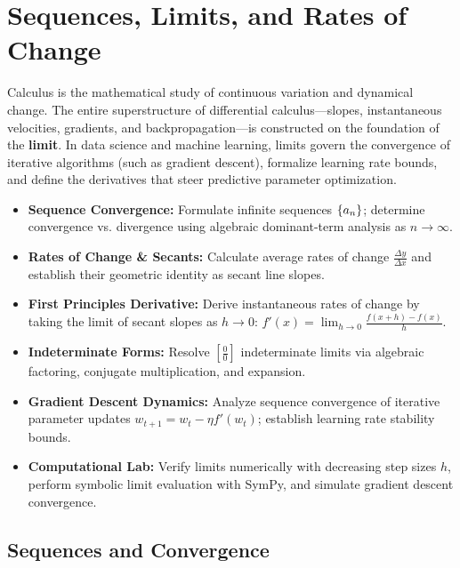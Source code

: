 \chapter{Sequences, Limits, and Rates of Change}

Calculus is the mathematical study of continuous variation and dynamical change. The entire superstructure of differential calculus—slopes, instantaneous velocities, gradients, and backpropagation—is constructed on the foundation of the \textbf{limit}. In data science and machine learning, limits govern the convergence of iterative algorithms (such as gradient descent), formalize learning rate bounds, and define the derivatives that steer predictive parameter optimization.

\vspace{0.3cm}
\begin{tcolorbox}[colback=primarylight, colframe=primarydark, title={\textbf{Executive Roadmap \& Learning Objectives}}]
\begin{itemize}
    \item \textbf{Sequence Convergence:} Formulate infinite sequences $\left\{a_n\right\}$; determine convergence vs. divergence using algebraic dominant-term analysis as $n \to \infty$.
    \item \textbf{Rates of Change \& Secants:} Calculate average rates of change $\frac{\Delta y}{\Delta x}$ and establish their geometric identity as secant line slopes.
    \item \textbf{First Principles Derivative:} Derive instantaneous rates of change by taking the limit of secant slopes as $h \to 0$: $f'(x) = \lim_{h \to 0} \frac{f(x + h) - f(x)}{h}$.
    \item \textbf{Indeterminate Forms:} Resolve $\left[\frac{0}{0}\right]$ indeterminate limits via algebraic factoring, conjugate multiplication, and expansion.
    \item \textbf{Gradient Descent Dynamics:} Analyze sequence convergence of iterative parameter updates $w_{t+1} = w_t - \eta f'(w_t)$; establish learning rate stability bounds.
    \item \textbf{Computational Lab:} Verify limits numerically with decreasing step sizes $h$, perform symbolic limit evaluation with SymPy, and simulate gradient descent convergence.
\end{itemize}
\end{tcolorbox}
\vspace{0.3cm}

\section{Sequences and Convergence}

